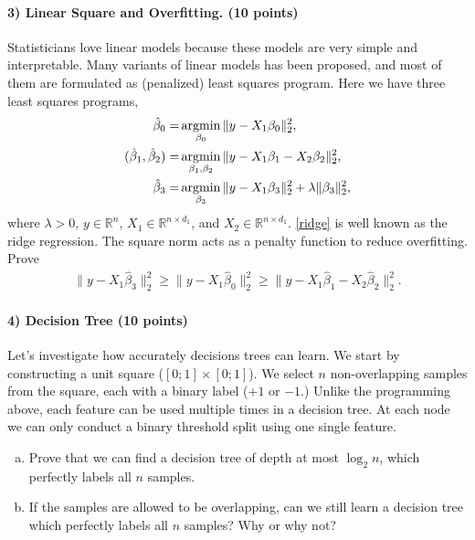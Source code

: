 \documentclass[11pt]{article}
\begin{document}
\paragraph{3) Linear Square and Overfitting. (10 points)}
Statisticians love linear models because these models are very simple and interpretable. Many variants of linear models has been proposed, and most of them are formulated as (penalized) least squares program. Here we have three least squares programs,
\begin{align}
\hat{\beta}_0 = &\mathop{\rm argmin}_{\beta_0}  \|y-X_1\beta_0\|_2^2, \label{partial}\\
(\hat{\beta}_1,\hat{\beta}_2) = &\mathop{\rm argmin}_{\beta_1,\beta_2}  \|y-X_1\beta_1-X_2\beta_2\|_2^2, \label{complete}\\
\hat{\beta}_3 = &\mathop{\rm argmin}_{\beta_3} \|y-X_1\beta_3\|_2^2 +\lambda\|\beta_3\|_2^2 \label{ridge},
\end{align}
where $\lambda>0$, $y\in\mathbb{R}^n$, $X_1\in\mathbb{R}^{n \times d_1}$, and $X_2\in\mathbb{R}^{n \times d_1}$. \eqref{ridge} is well known as the ridge regression. The square norm acts as a penalty function to reduce overfitting. Prove
\begin{align}\label{overfitting}
\|y-X_1\hat{\beta}_3\|_2^2 \geq \|y-X_1\hat{\beta}_0\|_2^2 \geq \|y-X_1\hat{\beta}_1-X_2\hat{\beta}_2\|_2^2.
\end{align}

\paragraph{4) Decision Tree (10 points)} Let's investigate how accurately decisions trees can learn. We start by constructing a unit square ($[0; 1] \times [0;1]$). We select $n$ non-overlapping samples from the square, each with a binary label ($+1$ or $-1$.) Unlike the programming above, each feature can be used multiple times in a decision tree. At each node we can only conduct a binary threshold split using one single feature. 
\begin{enumerate}[(a)]
\item Prove that we can find a decision tree of depth at most $\log_2n$, which perfectly labels all $n$ samples. 
\item If the samples are allowed to be overlapping, can we still learn a decision tree which perfectly labels all $n$ samples? Why or why not?
\end{enumerate}
\end{document}
